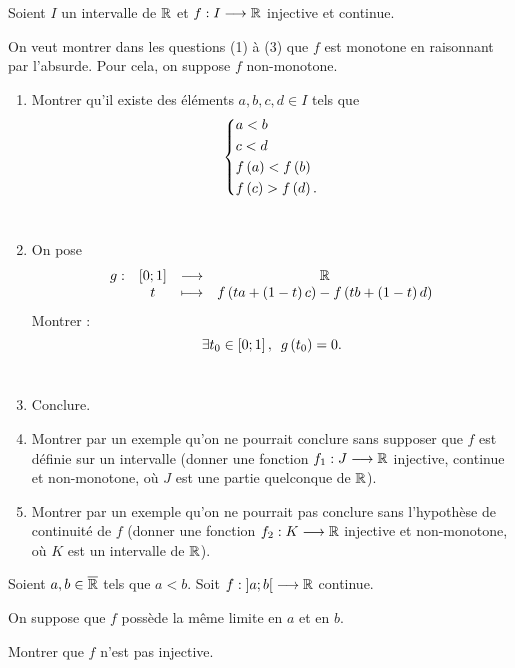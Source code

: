 \begin{exo}
Soient \(I\) un intervalle de \(\mathbb{R}\) et \(f:I\longrightarrow\mathbb{R}\) injective et continue.

On veut montrer dans les questions (1) à (3) que \(f\) est monotone en raisonnant par l'absurde. Pour cela, on suppose \(f\) non-monotone.

\begin{enumerate}
\item Montrer qu'il existe des éléments \(a,b,c,d\in I\) tels que \[\begin{dcases}a<b \\ c<d \\ f\left(a\right)<f\left(b\right) \\ f\left(c\right)>f\left(d\right).\end{dcases}\] \\

\item On pose \[\begin{array}[t]{cccc}g : & \left[0;1\right] & \longrightarrow & \mathbb{R} \\ & t & \longmapsto & f\left(ta+\left(1-t\right)c\right)-f\left(tb+\left(1-t\right)d\right)\end{array}\] Montrer : \[\quantifs{\exists t_0\in\intervii{0}{1}}g\paren{t_0}=0.\] \\

\item Conclure. \\

\item Montrer par un exemple qu'on ne pourrait conclure sans supposer que \(f\) est définie sur un intervalle (\cad donner une fonction \(f_1:J\longrightarrow\mathbb{R}\) injective, continue et non-monotone, où \(J\) est une partie quelconque de \(\mathbb{R}\)). \\

\item Montrer par un exemple qu'on ne pourrait pas conclure sans l'hypothèse de continuité de \(f\) (\cad donner une fonction \(f_2:K\longrightarrow\mathbb{R}\) injective et non-monotone, où \(K\) est un intervalle de \(\mathbb{R}\)).
\end{enumerate}
\end{exo}

\begin{corr}
\end{corr}

\begin{exo}[Exercice 17]
Soient \(a,b\in\overline{\mathbb{R}}\) tels que \(a<b\). Soit \(f:\left]a;b\right[\longrightarrow\mathbb{R}\) continue.

On suppose que \(f\) possède la même limite en \(a\) et en \(b\).

Montrer que \(f\) n'est pas injective.
\end{exo}

